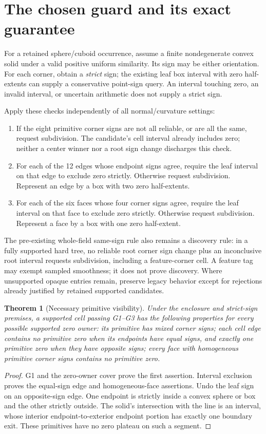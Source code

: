 \documentclass[11pt]{article}
\newtheorem{theorem}{Theorem}
\begin{document}
\section{The chosen guard and its exact guarantee}

For a retained sphere/cuboid occurrence, assume a finite nondegenerate convex
solid under a valid positive uniform similarity. Its sign may be either
orientation. For each corner, obtain a \emph{strict} sign; the existing leaf
box interval with zero half-extents can supply a conservative point-sign
query. An interval touching zero, an invalid interval, or uncertain arithmetic
does not supply a strict sign.

Apply these checks independently of all normal/curvature settings:
\begin{enumerate}[label=G\arabic*.]
\item If the eight primitive corner signs are not all reliable, or are all
the same, request subdivision. The candidate's cell interval already includes
zero; neither a center winner nor a root sign change discharges this check.
\item For each of the 12 edges whose endpoint signs agree, require the leaf
interval on that edge to exclude zero strictly. Otherwise request subdivision.
Represent an edge by a box with two zero half-extents.
\item For each of the six faces whose four corner signs agree, require the
leaf interval on that face to exclude zero strictly. Otherwise request
subdivision. Represent a face by a box with one zero half-extent.
\end{enumerate}

The pre-existing whole-field same-sign rule also remains a discovery rule:
in a fully supported hard tree, no reliable root corner sign change plus an
inconclusive root interval requests subdivision, including a feature-corner
cell. A feature tag may exempt sampled smoothness; it does not prove discovery.
Where unsupported opaque entries remain, preserve legacy behavior except for
rejections already justified by retained supported candidates.

\begin{theorem}[Necessary primitive visibility]
Under the enclosure and strict-sign premises, a supported cell passing G1--G3
has the following properties for every possible supported zero owner:
its primitive has mixed corner signs; each cell edge contains no primitive
zero when its endpoints have equal signs, and exactly one primitive zero
when they have opposite signs; every face with homogeneous primitive corner
signs contains no primitive zero.
\end{theorem}
\begin{proof}
G1 and the zero-owner cover prove the first assertion. Interval exclusion
proves the equal-sign edge and homogeneous-face assertions. Undo the leaf sign
on an opposite-sign edge. One endpoint is strictly inside a convex sphere or
box and the other strictly outside. The solid's intersection with the line is
an interval, whose interior endpoint-to-exterior endpoint portion has exactly
one boundary exit. These primitives have no zero plateau on such a segment.
\end{proof}
\end{document}
